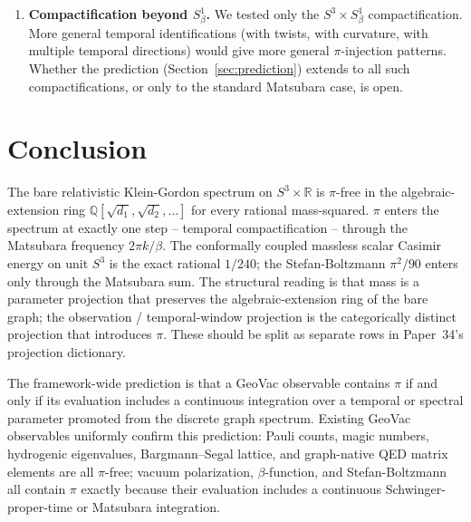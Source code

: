 \documentclass[11pt]{article}
\begin{document}
\begin{enumerate}
\item \textbf{Compactification beyond $S^1_\beta$.}  We tested only the
$S^3 \times S^1_\beta$ compactification.  More general temporal
identifications (with twists, with curvature, with multiple temporal
directions) would give more general $\pi$-injection patterns.  Whether
the prediction (Section~\ref{sec:prediction}) extends to all such
compactifications, or only to the standard Matsubara case, is open.

\end{enumerate}

\section{Conclusion}
\label{sec:conclusion}

The bare relativistic Klein-Gordon spectrum on $S^3 \times \mathbb{R}$
is $\pi$-free in the algebraic-extension ring
$\mathbb{Q}[\sqrt{d_1}, \sqrt{d_2}, \ldots]$ for every rational
mass-squared.  $\pi$ enters the spectrum at exactly one step --
temporal compactification -- through the Matsubara frequency
$2\pi k / \beta$.  The conformally coupled massless scalar Casimir
energy on unit $S^3$ is the exact rational $1/240$; the Stefan-Boltzmann
$\pi^2/90$ enters only through the Matsubara sum.  The structural
reading is that mass is a parameter projection that preserves the
algebraic-extension ring of the bare graph; the observation /
temporal-window projection is the categorically distinct projection
that introduces $\pi$.  These should be split as separate rows in
Paper~34's projection dictionary.

The framework-wide prediction is that a GeoVac observable contains
$\pi$ if and only if its evaluation includes a continuous integration
over a temporal or spectral parameter promoted from the discrete graph
spectrum.  Existing GeoVac observables uniformly confirm this
prediction: Pauli counts, magic numbers, hydrogenic eigenvalues,
Bargmann--Segal lattice, and graph-native QED matrix elements are all
$\pi$-free; vacuum polarization, $\beta$-function, and Stefan-Boltzmann
all contain $\pi$ exactly because their evaluation includes a
continuous Schwinger-proper-time or Matsubara integration.
\end{document}
